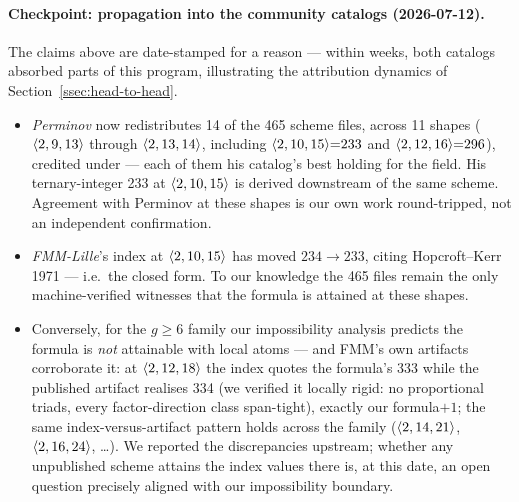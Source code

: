 \paragraph{Checkpoint: propagation into the community catalogs
(2026-07-12).} The claims above are date-stamped for a reason --- within
weeks, both catalogs absorbed parts of this program, illustrating the
attribution dynamics of Section~\ref{ssec:head-to-head}.
\begin{itemize}[itemsep=2pt]
  \item \emph{Perminov} now redistributes 14 of the 465 scheme files,
    across 11 shapes (\(\langle 2, 9, 13 \rangle\) through
    \(\langle 2, 13, 14 \rangle\), including
    \(\langle 2, 10, 15 \rangle{=}233\) and
    \(\langle 2, 12, 16 \rangle{=}296\)), credited under
     --- each of them his catalog's
    best holding for the field. His ternary-integer 233 at
    \(\langle 2, 10, 15 \rangle\) is derived downstream of the same scheme.
    Agreement with Perminov at these shapes is our own work
    round-tripped, not an independent confirmation.
  \item \emph{FMM-Lille}'s index at \(\langle 2, 10, 15 \rangle\) has moved
    \(234 \to 233\), citing Hopcroft--Kerr 1971 --- i.e.\ the closed
    form. To our knowledge the 465 files remain the only
    machine-verified witnesses that the formula is attained at these
    shapes.
  \item Conversely, for the \(g \ge 6\) family our impossibility
    analysis predicts the formula is \emph{not} attainable with local
    atoms --- and FMM's own artifacts corroborate it: at
    \(\langle 2, 12, 18 \rangle\) the index quotes the formula's 333 while
    the published artifact realises 334 (we verified it locally rigid:
    no proportional triads, every factor-direction class span-tight),
    exactly our formula\(+1\); the same index-versus-artifact pattern
    holds across the family (\(\langle 2, 14, 21 \rangle\),
    \(\langle 2, 16, 24 \rangle\), \ldots). We reported the discrepancies
    upstream; whether any unpublished scheme attains the index values
    there is, at this date, an open question precisely aligned with our
    impossibility boundary.
\end{itemize}

